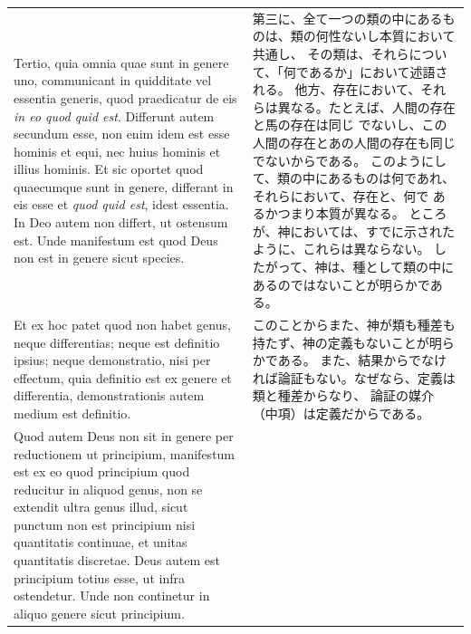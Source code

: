 \documentclass[paper=a4paper,fontsize=10pt,jafontsize=9pt,titlepage]{jlreq}
\begin{document}
\begin{longtable}{p{21em}p{21em}}
\\

Tertio, quia omnia quae sunt in genere uno, communicant in quidditate
 vel essentia generis, quod praedicatur de eis {\itshape in eo quod quid est}.
Differunt autem secundum esse, non enim idem est esse hominis et equi,
 nec huius hominis et illius hominis. 
Et sic oportet quod quaecumque sunt in genere, differant in eis esse et
 {\itshape quod quid est}, idest essentia.
In Deo autem non differt, ut ostensum est.
Unde manifestum est quod Deus non est in genere sicut species.

&

第三に、全て一つの類の中にあるものは、類の何性ないし本質において共通し、
 その類は、それらについて、「何であるか」において述語される。
他方、存在において、それらは異なる。たとえば、人間の存在と馬の存在は同じ
 でないし、この人間の存在とあの人間の存在も同じでないからである。
このようにして、類の中にあるものは何であれ、それらにおいて、存在と、何で
 あるかつまり本質が異なる。
ところが、神においては、すでに示されたように、これらは異ならない。
したがって、神は、種として類の中にあるのではないことが明らかである。

\\

Et ex hoc patet quod non habet genus, neque differentias; neque est
 definitio ipsius; neque demonstratio, nisi per effectum, quia definitio
 est ex genere et differentia, demonstrationis autem medium est
 definitio.

&
このことからまた、神が類も種差も持たず、神の定義もないことが明らかである。
 また、結果からでなければ論証もない。なぜなら、定義は類と種差からなり、
 論証の媒介（中項）は定義だからである。

\\

Quod autem Deus non sit in genere per reductionem ut principium,
 manifestum est ex eo quod principium quod reducitur in aliquod genus,
 non se extendit ultra genus illud, sicut punctum non est principium
 nisi quantitatis continuae, et unitas quantitatis discretae.
Deus autem est principium totius esse, ut infra ostendetur. Unde non
 continetur in aliquo genere sicut principium.

&


\end{longtable}
\end{document}
